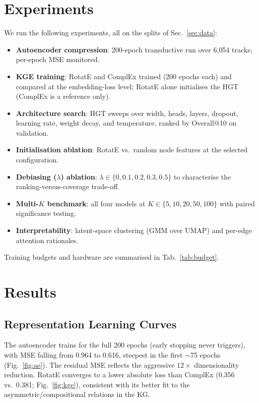 \documentclass[10pt,twocolumn,letterpaper]{article}
\begin{document}
\section{Experiments}
\label{sec:experiments}

We run the following experiments, all on the splits of Sec.~\ref{sec:data}:
\begin{itemize}\setlength\itemsep{1pt}
  \item \textbf{Autoencoder compression}: 200-epoch transductive run over 6{,}054
        tracks; per-epoch MSE monitored.
  \item \textbf{KGE training}: RotatE and ComplEx trained (200 epochs each) and
        compared at the embedding-loss level; RotatE alone initialises the HGT
        (ComplEx is a reference only).
  \item \textbf{Architecture search}: HGT sweeps over width, heads, layers,
        dropout, learning rate, weight decay, and temperature, ranked by Overall@10
        on validation.
  \item \textbf{Initialisation ablation}: RotatE vs.\ random node features at the
        selected configuration.
  \item \textbf{Debiasing ($\lambda$) ablation}: $\lambda\in\{0,0.1,0.2,0.3,0.5\}$
        to characterise the ranking-versus-coverage trade-off.
  \item \textbf{Multi-$K$ benchmark}: all four models at
        $K\in\{5,10,20,50,100\}$ with paired significance testing.
  \item \textbf{Interpretability}: latent-space clustering (GMM over UMAP) and
        per-edge attention rationales.
\end{itemize}
Training budgets and hardware are summarised in Tab.~\ref{tab:budget}.

\section{Results}
\label{sec:results}

\subsection{Representation Learning Curves}
The autoencoder trains for the full 200 epochs (early stopping never triggers),
with MSE falling from 0.964 to 0.616, steepest in the first $\sim$75 epochs
(Fig.~\ref{fig:ae}). The residual MSE reflects the aggressive $12\times$
dimensionality reduction. RotatE converges to a lower absolute loss than ComplEx
(0.356 vs.\ 0.381; Fig.~\ref{fig:kge}), consistent with its better fit to the
asymmetric/compositional relations in the KG.
\end{document}
